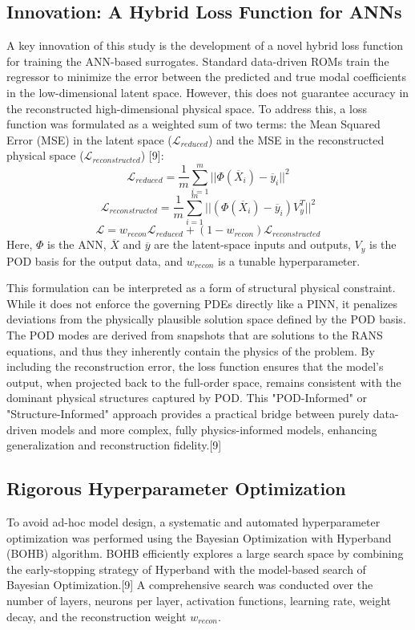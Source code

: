 \documentclass[12pt, a4paper]{report}
\begin{document}
\subsection{Innovation: A Hybrid Loss Function for ANNs}
A key innovation of this study is the development of a novel hybrid loss function for training the ANN-based surrogates. Standard data-driven ROMs train the regressor to minimize the error between the predicted and true modal coefficients in the low-dimensional latent space. However, this does not guarantee accuracy in the reconstructed high-dimensional physical space. To address this, a loss function was formulated as a weighted sum of two terms: the Mean Squared Error (MSE) in the latent space ($\mathcal{L}_{reduced}$) and the MSE in the reconstructed physical space ($\mathcal{L}_{reconstructed}$) [9]:
$$\mathcal{L}_{reduced} = \frac{1}{m} \sum_{i=1}^{m} ||\Phi(\overline{X}_i) - \overline{y}_i||^2$$
$$
\mathcal{L}_{reconstructed} = \frac{1}{m} \sum_{i=1}^{m} ||(\Phi(\overline{X}_i) - \overline{y}_i)V_y^T||^2
$$
$$\mathcal{L} = w_{recon}\mathcal{L}_{reduced} + (1 - w_{recon})\mathcal{L}_{reconstructed}$$
Here, $\Phi$ is the ANN, $\overline{X}$ and $\overline{y}$ are the latent-space inputs and outputs, $V_y$ is the POD basis for the output data, and $w_{recon}$ is a tunable hyperparameter.

This formulation can be interpreted as a form of structural physical constraint. While it does not enforce the governing PDEs directly like a PINN, it penalizes deviations from the physically plausible solution space defined by the POD basis. The POD modes are derived from snapshots that are solutions to the RANS equations, and thus they inherently contain the physics of the problem. By including the reconstruction error, the loss function ensures that the model's output, when projected back to the full-order space, remains consistent with the dominant physical structures captured by POD. This "POD-Informed" or "Structure-Informed" approach provides a practical bridge between purely data-driven models and more complex, fully physics-informed models, enhancing generalization and reconstruction fidelity.[9]

\subsection{Rigorous Hyperparameter Optimization}
To avoid ad-hoc model design, a systematic and automated hyperparameter optimization was performed using the Bayesian Optimization with Hyperband (BOHB) algorithm. BOHB efficiently explores a large search space by combining the early-stopping strategy of Hyperband with the model-based search of Bayesian Optimization.[9] A comprehensive search was conducted over the number of layers, neurons per layer, activation functions, learning rate, weight decay, and the reconstruction weight $w_{recon}$.
\end{document}
